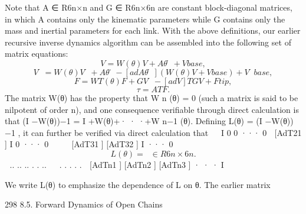 \documentclass[12pt,a4paper]{article}
\begin{document}
Note that A ∈ R6n×n and G ∈ R6n×6n are constant block-diagonal matrices,
in which A contains only the kinematic parameters while G contains only the
mass and inertial parameters for each link.
   With the above definitions, our earlier recursive inverse dynamics algorithm
can be assembled into the following set of matrix equations:
\begin{equation}
V    = W(θ)V + Aθ̇ + Vbase ,
\label{eq:8.68}
\end{equation}
\begin{equation}
V̇   = W(θ)V̇ + Aθ̈ − [adAθ̇ ](W(θ)V + Vbase ) + V̇base ,
\label{eq:8.69}
\end{equation}
\begin{equation}
F     = W T (θ)F + G V̇ − [adV ]T GV + Ftip ,
\label{eq:8.70}
\end{equation}
\begin{equation}
τ     = AT F.
\label{eq:8.71}
\end{equation}
The matrix W(θ) has the property that W n (θ) = 0 (such a matrix is said to be
nilpotent of order n), and one consequence verifiable through direct calculation
is that (I −W(θ))−1 = I +W(θ)+· · ·+W n−1 (θ). Defining L(θ) = (I −W(θ))−1 ,
it can further be verified via direct calculation that
                                                         
                     I          0         0      ··· 0
                [AdT21 ]       I         0      ··· 0 
                                                         
                [AdT31 ] [AdT32 ]        I      ··· 0 
\begin{equation}
L(θ) =                                            ∈ R6n×6n .
\label{eq:8.72}
\end{equation}
                     ..        ..         ..    . .   .. 
                      .         .          .        . . 
                       [AdTn1 ]     [AdTn2 ]    [AdTn3 ] · · ·      I

We write L(θ) to emphasize the dependence of L on θ. The earlier matrix


298                                                    8.5. Forward Dynamics of Open Chains
\end{document}
